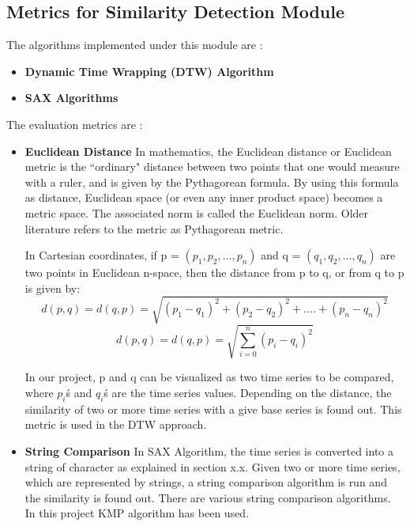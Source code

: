 \documentclass[12pt]{report}
\begin{document}
\subsection{Metrics for Similarity Detection Module}
The algorithms implemented under this module are :
\begin{itemize}
\item \textbf{Dynamic Time Wrapping (DTW) Algorithm}
\item \textbf{SAX Algorithms}
\end{itemize}
The evaluation metrics are :
\begin{itemize}
\item \textbf{Euclidean Distance} In mathematics, the Euclidean distance or Euclidean metric is the ``ordinary" distance between two points that one would measure with a ruler, and is given by the Pythagorean formula. By using this formula as distance, Euclidean space (or even any inner product space) becomes a metric space. The associated norm is called the Euclidean norm. Older literature refers to the metric as Pythagorean metric.



In Cartesian coordinates, if p = $(p_1, p_2,..., p_n)$ and q = $(q_1, q_2,..., q_n)$ are two points in Euclidean n-space, then the distance from p to q, or from q to p is given by:
$$d(p,q)=d(q,p)=\sqrt{(p_1-q_1)^2+(p_2-q_2)^2+....+(p_n-q_n)^2} $$
$$d(p,q)=d(q,p)=\sqrt{\sum_{i=0}^{n}{(p_i-q_i)^2}}$$


In our project, p and q can be visualized as two time series to be compared, where $p_i$\'s and $q_i$\'s are the time series values.
Depending on the distance, the similarity of two or more time series with a give base series is found out. This metric is used in the DTW approach.
\item \textbf{String Comparison} In SAX Algorithm, the time series is converted into a string of character as explained in section x.x. Given two or more time series, which are represented by strings, a string comparison algorithm is run and the similarity is found out. There are various string comparison algorithms. In this project KMP algorithm has been used.
\end{itemize}
\end{document}
